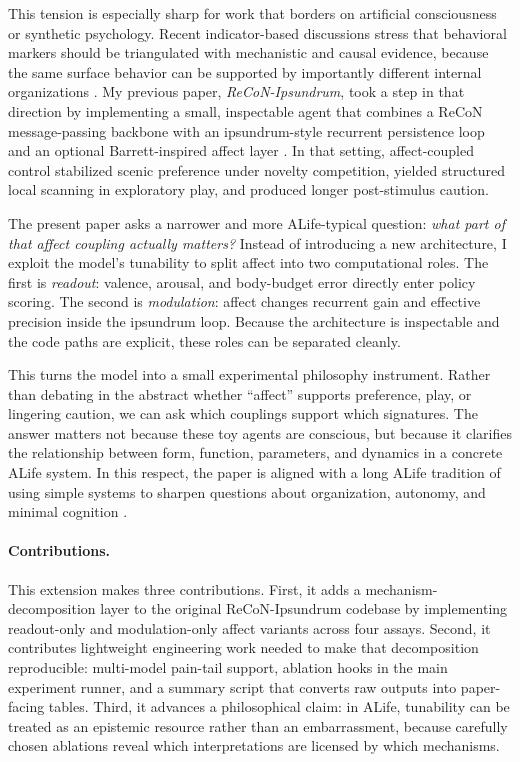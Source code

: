 \documentclass[letterpaper]{article}
\begin{document}
This tension is especially sharp for work that borders on artificial consciousness or synthetic psychology. Recent indicator-based discussions stress that behavioral markers should be triangulated with mechanistic and causal evidence, because the same surface behavior can be supported by importantly different internal organizations \citep{ButlinEtAl2025Indicators}. My previous paper, \emph{ReCoN-Ipsundrum}, took a step in that direction by implementing a small, inspectable agent that combines a ReCoN message-passing backbone with an ipsundrum-style recurrent persistence loop and an optional Barrett-inspired affect layer \citep{BachHerger2015ReCoN,Humphrey2023Sentience,Barrett2017HowEmotions,Sanyal2026ReCoNIpsundrum}. In that setting, affect-coupled control stabilized scenic preference under novelty competition, yielded structured local scanning in exploratory play, and produced longer post-stimulus caution.

The present paper asks a narrower and more ALife-typical question: \emph{what part of that affect coupling actually matters?} Instead of introducing a new architecture, I exploit the model's tunability to split affect into two computational roles. The first is \emph{readout}: valence, arousal, and body-budget error directly enter policy scoring. The second is \emph{modulation}: affect changes recurrent gain and effective precision inside the ipsundrum loop. Because the architecture is inspectable and the code paths are explicit, these roles can be separated cleanly.

This turns the model into a small experimental philosophy instrument. Rather than debating in the abstract whether ``affect'' supports preference, play, or lingering caution, we can ask which couplings support which signatures. The answer matters not because these toy agents are conscious, but because it clarifies the relationship between form, function, parameters, and dynamics in a concrete ALife system. In this respect, the paper is aligned with a long ALife tradition of using simple systems to sharpen questions about organization, autonomy, and minimal cognition \citep{Beer2020Autopoiesis}.

\paragraph{Contributions.} This extension makes three contributions. First, it adds a mechanism-decomposition layer to the original ReCoN-Ipsundrum codebase by implementing readout-only and modulation-only affect variants across four assays. Second, it contributes lightweight engineering work needed to make that decomposition reproducible: multi-model pain-tail support, ablation hooks in the main experiment runner, and a summary script that converts raw outputs into paper-facing tables. Third, it advances a philosophical claim: in ALife, tunability can be treated as an epistemic resource rather than an embarrassment, because carefully chosen ablations reveal which interpretations are licensed by which mechanisms.
\end{document}
